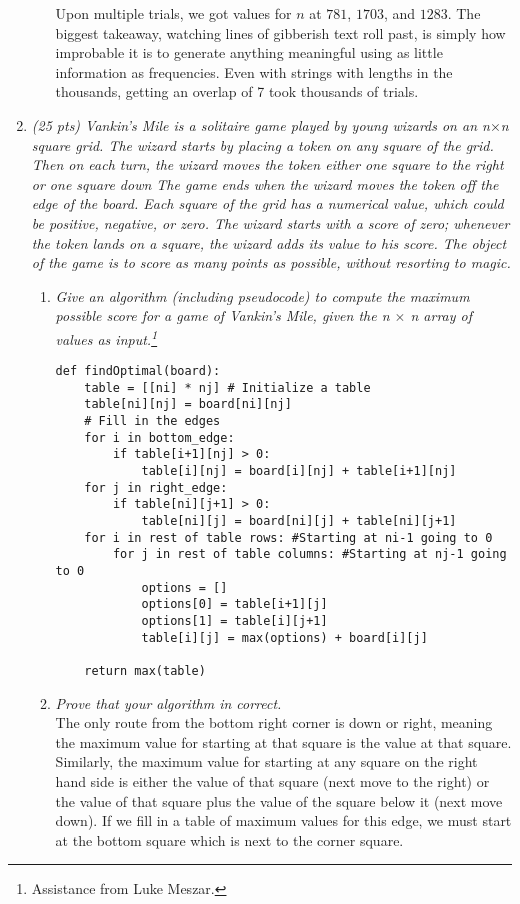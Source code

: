 \documentclass[12pt]{article}
\begin{document}
\begin{enumerate}
\begin{enumerate}
        	Upon multiple trials, we got values for $n$ at $781$, $1703$, and $1283$. The biggest takeaway, watching lines of gibberish text roll past, is simply how improbable it is to generate anything meaningful using as little information as frequencies. Even with strings with lengths in the thousands, getting an overlap of 7 took thousands of trials. 
    	
	    \end{enumerate}
    
    \newpage
    \item \textit{(25 pts) Vankin's Mile is a solitaire game played by young wizards on an n$\times$n square grid. The wizard starts by placing a token on any square of the grid. Then on each turn, the wizard moves the token either one square to the right or one square down The game ends when the wizard moves the token off the edge of the board. Each square of the grid has a numerical value, which could be positive, negative, or zero. The wizard starts with a score of zero; whenever the token lands on a square, the wizard adds its value to his score. The object of the game is to score as many points as possible, without resorting to magic.}
    \begin{enumerate}
        \item \textit{Give an algorithm (including pseudocode) to compute the maximum possible score for a game of Vankin’s Mile, given the n $\times$ n array of values as input.\footnote{Assistance from Luke Meszar.}}
        
        \begin{Verbatim}
def findOptimal(board):
    table = [[ni] * nj] # Initialize a table
    table[ni][nj] = board[ni][nj]
    # Fill in the edges
    for i in bottom_edge:
        if table[i+1][nj] > 0:
            table[i][nj] = board[i][nj] + table[i+1][nj]
    for j in right_edge:
        if table[ni][j+1] > 0:
            table[ni][j] = board[ni][j] + table[ni][j+1]
    for i in rest of table rows: #Starting at ni-1 going to 0
        for j in rest of table columns: #Starting at nj-1 going to 0
            options = []
            options[0] = table[i+1][j]
            options[1] = table[i][j+1]
            table[i][j] = max(options) + board[i][j]

    return max(table)
        \end{Verbatim}
        
        \item \textit{Prove that your algorithm in correct.} \\
        The only route from the bottom right corner is down or right, meaning the maximum value for starting at that square is the value at that square. Similarly, the maximum value for starting at any square on the right hand side is either the value of that square (next move to the right) or the value of that square plus the value of the square below it (next move down). If we fill in a table of maximum values for this edge, we must start at the bottom square which is next to the corner square.\\
        

\end{enumerate}
\end{enumerate}
\end{document}
